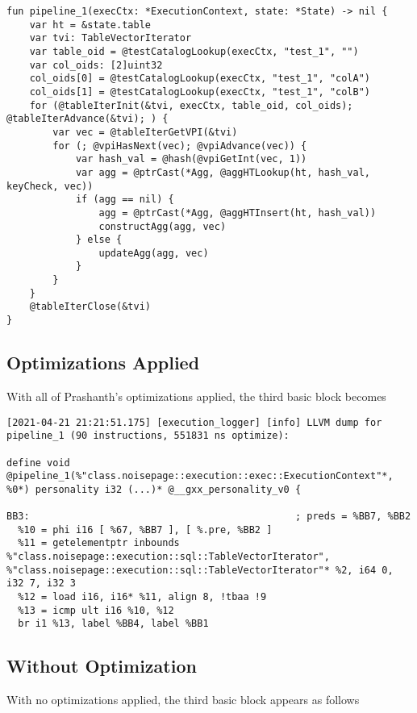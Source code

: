 \documentclass{vldb}
\begin{document}
\begin{lstlisting}
fun pipeline_1(execCtx: *ExecutionContext, state: *State) -> nil {
    var ht = &state.table
    var tvi: TableVectorIterator
    var table_oid = @testCatalogLookup(execCtx, "test_1", "")
    var col_oids: [2]uint32
    col_oids[0] = @testCatalogLookup(execCtx, "test_1", "colA")
    col_oids[1] = @testCatalogLookup(execCtx, "test_1", "colB")
    for (@tableIterInit(&tvi, execCtx, table_oid, col_oids); @tableIterAdvance(&tvi); ) {
        var vec = @tableIterGetVPI(&tvi)
        for (; @vpiHasNext(vec); @vpiAdvance(vec)) {
            var hash_val = @hash(@vpiGetInt(vec, 1))
            var agg = @ptrCast(*Agg, @aggHTLookup(ht, hash_val, keyCheck, vec))
            if (agg == nil) {
                agg = @ptrCast(*Agg, @aggHTInsert(ht, hash_val))
                constructAgg(agg, vec)
            } else {
                updateAgg(agg, vec)
            }
        }
    }
    @tableIterClose(&tvi)
}
\end{lstlisting}

\subsection{Optimizations Applied}

With all of Prashanth's optimizations applied, the third basic block becomes

\begin{lstlisting}
[2021-04-21 21:21:51.175] [execution_logger] [info] LLVM dump for pipeline_1 (90 instructions, 551831 ns optimize):

define void @pipeline_1(%"class.noisepage::execution::exec::ExecutionContext"*, %0*) personality i32 (...)* @__gxx_personality_v0 {

BB3:                                              ; preds = %BB7, %BB2
  %10 = phi i16 [ %67, %BB7 ], [ %.pre, %BB2 ]
  %11 = getelementptr inbounds %"class.noisepage::execution::sql::TableVectorIterator", %"class.noisepage::execution::sql::TableVectorIterator"* %2, i64 0, i32 7, i32 3
  %12 = load i16, i16* %11, align 8, !tbaa !9
  %13 = icmp ult i16 %10, %12
  br i1 %13, label %BB4, label %BB1
\end{lstlisting}

\subsection{Without Optimization}

With no optimizations applied, the third basic block appears as follows
\end{document}
